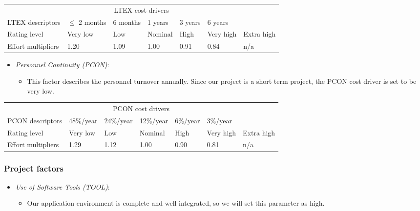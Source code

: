 \begin{table}[H]
	\hspace*{-1.7cm}
	\begin{tabular}{|p{2cm}|p{2.04cm}|p{1.96cm}|p{2cm}|p{2cm}|p{2cm}|p{2cm}|}
		\hline
		\multicolumn{7}{|c|}{LTEX cost drivers} \\
		\hhline{|=======|}
		LTEX descriptors & \(\leq\) 2 months & 6 months & 1 years & 3 years & 6 years & \\
		\hline
		Rating level & Very low & Low & Nominal & High & Very high & Extra high \\
		\hline
		Effort multipliers & 1.20 & 1.09 & 1.00 & 0.91 & 0.84 & n/a \\
		\hline
	\end{tabular}
\end{table}

\begin{itemize}
	\item \emph{Personnel Continuity (PCON)}:
	\begin{itemize}
		\item[] This factor describes the personnel turnover annually. Since our project is a short term project, the PCON cost driver is set to be very low.
	\end{itemize}
\end{itemize}

\begin{table}[H]
	\hspace*{-1.7cm}
	\begin{tabular}{|p{2cm}|p{2cm}|p{2cm}|p{2cm}|p{2cm}|p{2cm}|p{2cm}|}
		\hline
		\multicolumn{7}{|c|}{PCON cost drivers} \\
		\hhline{|=======|}
		PCON descriptors & 48\%/year & 24\%/year & 12\%/year & 6\%/year & 3\%/year & \\
		\hline
		Rating level & Very low & Low & Nominal & High & Very high & Extra high \\
		\hline
		Effort multipliers & 1.29 & 1.12 & 1.00 & 0.90 & 0.81 & n/a \\
		\hline
	\end{tabular}
\end{table}

\subsubsection{Project factors}

\begin{itemize}
	\item \emph{Use of Software Tools (TOOL)}:
	\begin{itemize}
		\item[] Our application environment is complete and well integrated, so we will set this parameter as high.
	\end{itemize}
\end{itemize}

